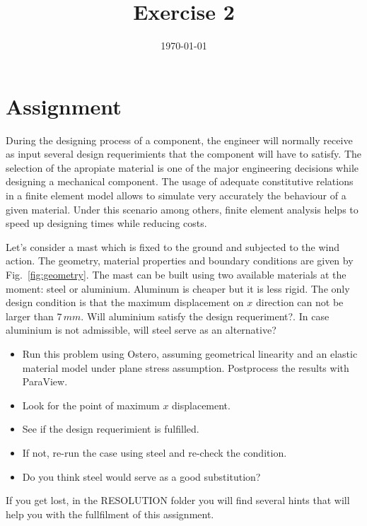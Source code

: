 \documentclass[12pt]{article}
\title{Exercise 2}
\date{\today}
\begin{document}
\maketitle

\section{Assignment}
During the designing process of a component, the engineer will normally receive as input several design requerimients that the component will have to satisfy. The selection of the apropiate material is one of the major engineering decisions while designing a mechanical component. The usage of adequate constitutive relations in a finite element model allows to simulate very accurately the behaviour of a given material. Under this scenario among others, finite element analysis helps to speed up designing times while reducing costs. 

\medskip

Let's consider a mast which is fixed to the ground and subjected to the wind action. The geometry, material properties and boundary conditions are given by Fig.~\ref{fig:geometry}. The mast can be built using two available materials at the moment: steel or aluminium. Aluminum is cheaper but it is less rigid. The only design condition is that the maximum displacement on $x$ direction can not be larger than $7\,mm$. Will aluminium satisfy the design requeriment?. In case aluminium is not admissible, will steel serve as an alternative?

\begin{itemize}
\item Run this problem using Ostero, assuming geometrical linearity and an elastic material model under plane stress assumption. Postprocess the results with ParaView. 
\item Look for the point of maximum $x$ displacement.
\item See if the design requerimient is fulfilled.
\item If not, re-run the case using steel and re-check the condition.
\item Do you think steel would serve as a good substitution?
\end{itemize}

If you get lost, in the RESOLUTION folder you will find several hints that will help you with the fullfilment of this assignment.

\medskip
\end{document}
